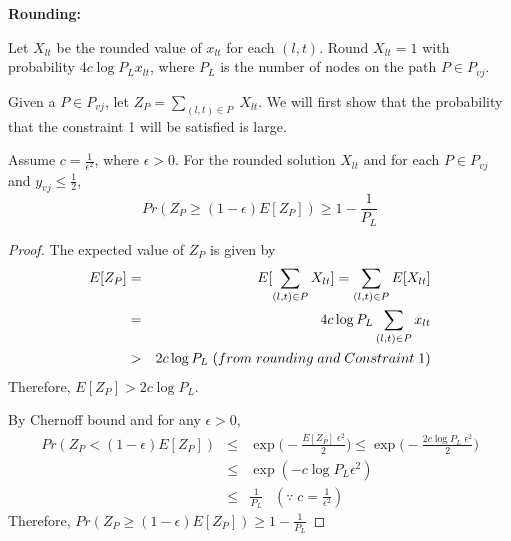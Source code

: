 
\noindent
\textbf{Rounding:} 

\noindent
Let $X_{lt}$ be the rounded value of $x_{lt}$ for each $(l, t)$. Round $X_{lt} = 1$ with probability $4c \log{P_L} x_{lt}$, where $P_L$ is the number of nodes on the path $P \in P_{vj}$.


\medskip
\noindent
Given a $P \in P_{vj}$, let $Z_P = \sum_{(l,t) \in P} \; X_{lt}$. We will first show that the probability that the constraint 1 will be satisfied is large.
\begin{claim}
Assume $c = \frac{1}{\epsilon^2}$, where $\epsilon > 0$. For the rounded solution $X_{lt}$ and for each $P \in P_{vj}$ and $y_{vj} \leq \frac{1}{2}$,
\begin{equation*}
 Pr(Z_P \geq (1-\epsilon) E[Z_P]) \geq 1 - \frac{1}{P_L}    
\end{equation*}
\end{claim}
\begin{proof}
The expected value of $Z_P$ is given by
\begin{eqnarray*}
    \centering
    E[Z_P]  &=& E[\sum_{(l,t) \in P} X_{lt}] =  \sum_{(l,t) \in P} E[X_{lt}] \\
          &=& 4c\log P_L  \sum_{(l,t) \in P} x_{lt} \\
          &>& 2c\log P_L \; (from \; rounding \; and \; Constraint \; 1) \\
\end{eqnarray*}
Therefore, $E[Z_P] > 2c\log P_L$.


\medskip
\noindent
By Chernoff bound and for any $\epsilon > 0$,
\begin{eqnarray*}
   Pr(Z_P < (1-\epsilon) E[Z_P]) & \leq & \exp\bigg(- \frac{E[Z_P] \; \epsilon^2}{2}\bigg) 
    \leq  \exp\bigg(-\frac{2c\log P_L \; \epsilon^2}{2}\bigg) \\
   & \leq & \exp(- c\log P_L \epsilon^2) \\
   & \leq &  \frac{1}{P_L} \enspace \; (\because \;  c = \frac{1}{\epsilon^2})
\end{eqnarray*}
Therefore, $Pr(Z_P \geq (1-\epsilon) E[Z_P]) \geq 1 - \frac{1}{P_L}$
\end{proof}


